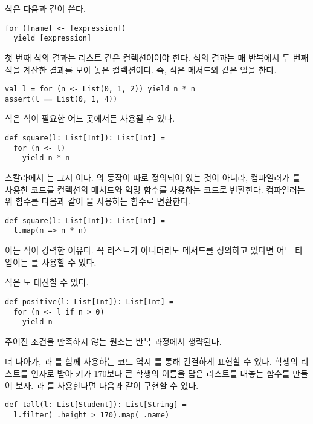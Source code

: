  식은 다음과 같이 쓴다.

\begin{verbatim}
for ([name] <- [expression])
  yield [expression]
\end{verbatim}

첫 번째 식의 결과는 리스트 같은 컬렉션이어야 한다.  식의 결과는 매
반복에서 두 번째 식을 계산한 결과를 모아 놓은 컬렉션이다. 즉,  식은
 메서드와 같은 일을 한다.

\begin{verbatim}
val l = for (n <- List(0, 1, 2)) yield n * n
assert(l == List(0, 1, 4))
\end{verbatim}

 식은 식이 필요한 어느 곳에서든 사용될 수 있다.

\begin{verbatim}
def square(l: List[Int]): List[Int] =
  for (n <- l)
    yield n * n
\end{verbatim}

스칼라에서 는 그저 이다. 의
동작이 따로 정의되어 있는 것이 아니라, 컴파일러가 를 사용한 코드를
컬렉션의 메서드와 익명 함수를 사용하는 코드로 변환한다. 컴파일러는 위 함수를
다음과 같이 을 사용하는 함수로 변환한다.

\begin{verbatim}
def square(l: List[Int]): List[Int] =
  l.map(n => n * n)
\end{verbatim}

이는  식이 강력한 이유다. 꼭 리스트가 아니더라도  메서드를
정의하고 있다면 어느 타입이든 를 사용할 수 있다.

 식은 도 대신할 수 있다.

\begin{verbatim}
def positive(l: List[Int]): List[Int] =
  for (n <- l if n > 0)
    yield n
\end{verbatim}

주어진 조건을 만족하지 않는 원소는 반복 과정에서 생략된다.

더 나아가, 과 를 함께 사용하는 코드 역시 를
통해 간결하게 표현할 수 있다. 학생의 리스트를 인자로 받아 키가 170보다 큰 학생의
이름을 담은 리스트를 내놓는 함수를 만들어 보자. 과 를
사용한다면 다음과 같이 구현할 수 있다.

\begin{verbatim}
def tall(l: List[Student]): List[String] =
  l.filter(_.height > 170).map(_.name)
\end{verbatim}

